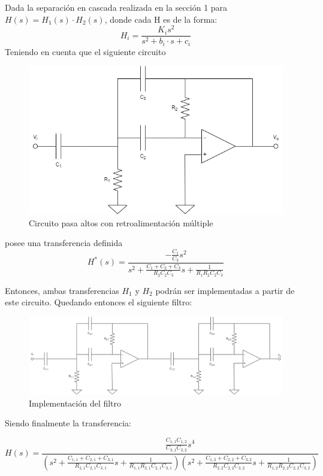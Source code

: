Dada la separación en cascada realizada en la sección 1 para $H(s) = H_1(s)\cdot H_2(s)$, donde cada H es de la forma:
$$
    H_i = \frac{K_i s^2}{s^2 + b_i \cdot s + c_i}
$$
Teniendo en cuenta que el siguiente circuito
\begin{figure}[H]
    \centering
    \includegraphics[width=1\textwidth]{resources/Filtro.png}
    \caption{Circuito pasa altos con retroalimentación múltiple}
\end{figure}

posee una transferencia definida
$$
    H^{*}(s) = \frac{-\frac{C_1}{C_3}s^2}{s^2+\frac{C_1+C_2+C_3}{R_2C_2C_3}s+\frac{1}{R_1R_2C_2C_3}}
$$
\vskip0.5cm

Entonces, ambas transferencias $H_1$ y $H_2$ podrán ser implementadas a partir de este circuito. Quedando entonces el siguiente filtro:
\begin{figure}[H]
    \centering
    \includegraphics[width=1\textwidth]{resources/FiltroCompleto.png}
    \caption{Implementación del filtro}
\end{figure}

Siendo finalmente la transferencia:

$$
    H(s) = \frac
            {\frac{C_{1,1}C_{1,2}}{C_{3,1}C_{3,2}}s^4}
            {(s^2 +\frac{C_{1,1}+C_{2,1}+C_{3,1}}{R_{2,1}C_{2,1}C_{3,1}}s+\frac{1}{R_{1,1}R_{2,1}C_{2,1}C_{3,1}}) (s^2 +\frac{C_{1,2}+C_{2,2}+C_{3,2}}{R_{2,2}C_{2,2}C_{3,2}}s+\frac{1}{R_{1,2}R_{2,2}C_{2,2}C_{3,2}})}
$$